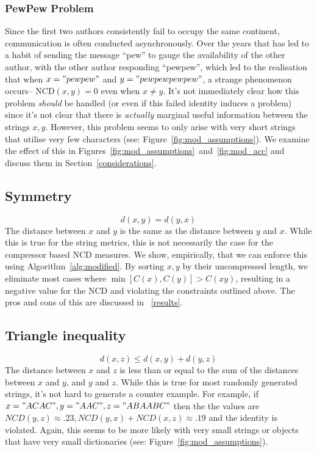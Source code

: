 \documentclass[conference]{IEEEtran}
\begin{document}
\subsubsection{PewPew Problem}
Since the first two authors consistently fail to occupy the same continent, communication is often conducted asynchronously. 
Over the years that has led to a habit of sending the message ``pew'' to gauge the availability of the other author, with the other author responding ``pewpew'', which led to the realisation that when $x = "pewpew"$ and $y="pewpewpewpew"$, a strange phenomenon occurs-- NCD$(x,y) = 0$ even when $x \neq y$. 
It's not immediately clear how this problem \textit{should} be handled (or even if this failed identity induces a problem) since it's not clear that there is \textit{actually} marginal useful information between the strings $x,y$. 
However, this problem seems to only arise with very short strings that utilise very few characters (see: Figure~\ref{fig:mod_assumptions}).
We examine the effect of this in Figures~\ref{fig:mod_assumptions}~and~\ref{fig:mod_acc} and discuss them in Section~\ref{considerations}.

\subsection{Symmetry} 
\[
d(x, y) = d(y, x)
\]
The distance between \( x \) and \( y \) is the same as the distance between \( y \) and \( x \). While this is true for the string metrics, this is not necessarily the case for the compressor based NCD measures. 
We show, empirically, that we can enforce this using Algorithm~\ref{alg:modified}. 
By sorting $x,y$ by their uncompressed length, we eliminate most cases where $\min[C(x), C(y)] > C(xy)$, resulting in a negative value for the NCD and violating the constraints outlined above.
The pros and cons of this are discussed in ~\ref{results}.

\subsection{Triangle inequality} 
\[
d(x, z) \leq d(x, y) + d(y, z)
\]
The distance between \( x \) and \( z \) is less than or equal to the sum of the distances between \( x \) and \( y \), and \( y \) and \( z \). While this is true for most randomly generated strings, it's not hard to generate a counter example. 
For example, if $ x = "ACAC", y = "AAC", z = "ABAABC" $ then the the values are $ NCD(y,z) \approx .23, NCD(y,x) + NCD(x,z) \approx .19 $ and the identity is violated. 
Again, this seems to be more likely with very small strings or objects that have very small dictionaries (see: Figure~\ref{fig:mod_assumptions}).
\end{document}
